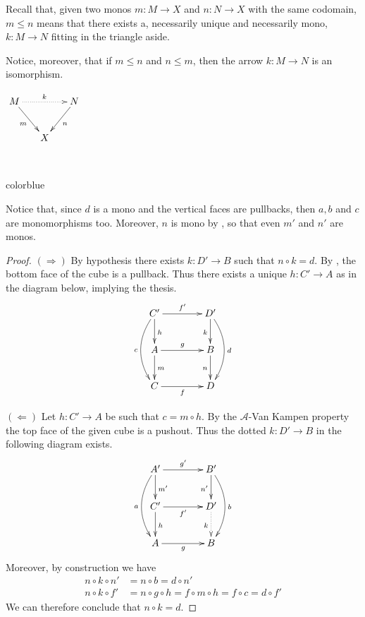 \documentclass[a4paper,UKenglish,cleveref,pdftex,thm-restate,numberwithinsect,anonymous]{lipics}
\newcommand{\full}[1]{{color{blue}#1}}
\newcommand{\full}[1]{}
\begin{document}
\noindent 
\parbox{11cm}{\begin{remark}
	Recall that, given two monos $m:M\to X$ and $n:N\to X$ with the same codomain, $m\leq n$ means that there exists a, necessarily unique and necessarily mono, $k:M\to N$ fitting in the triangle aside.	
	
	\hspace{15pt}Notice, moreover, that  if $m\leq n$ and $n\leq m$, then the arrow $k:M\to N$ is an isomorphism.
\end{remark}}
\parbox{4cm}{$\xymatrix@C=15pt{M\ar@{.>}[rr]^{k}  \ar[dr]_{m}&& N \ar[dl]^{n}\\ & X}$}\\

\full{ 
\begin{remark}
	Notice that, since $d$ is a mono and the vertical faces are pullbacks, then $a, b$ and $c$ are monomorphisms too. Moreover, $n$ is mono by \Cref{prop:pbpo}, so that even $m'$ and $n'$ are monos.
\end{remark}

\begin{proof}
	$(\Rightarrow)$ By hypothesis there exists $k:D'\to B$ such that $n\circ k = d$. By \Cref{prop:pbpo}, the bottom face of the cube is a pullback. Thus there exists a unique $h:C'\to A$ as in the diagram below, implying the thesis.
	\[\xymatrix@C=40pt{C'  \ar[d]^{h}\ar[r]^{f'} \ar@/_.5cm/[dd]_{c}& D' \ar@/^.5cm/[dd]^{d}\ar[d]_{k}\\ A \ar[d]^{m} \ar[r]^{g} & B \ar[d]_{n} \\  C \ar[r]_f & D}\]

	\smallskip \noindent
	$(\Leftarrow)$ Let $h:C'\to A$ be such that $c=m\circ h$. By the $\mathcal{A}$-Van Kampen property the top face of the given cube is a pushout. Thus the dotted $k:D'\to B$ in the following diagram exists.
	\[\xymatrix@C=40pt{A' \ar@/_.5cm/[dd]_{a} \ar[d]^{m'} \ar[r]^{g'} & B' \ar[d]_{n'} \ar@/^.5cm/[dd]^{b} \\  C' \ar[d]^{h} \ar[r]_{f'} & D' \ar@{.>}[d]_{k}\\ A \ar[r]_g& B }\]
	Moreover, by construction we have
	\begin{align*}
		n\circ k \circ n' & = n\circ b=d\circ n'                                  \\
		n\circ k \circ f' & = n\circ g\circ h=f\circ m\circ h=f\circ c= d\circ f'
	\end{align*}
	We can therefore conclude that $n\circ k =d$.
\end{proof}}
\end{document}
